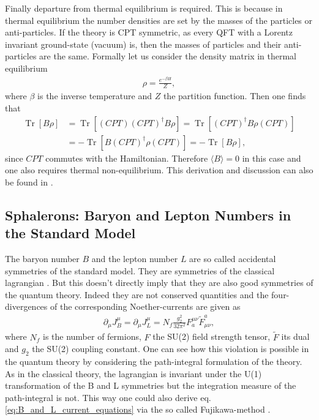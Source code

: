 \documentclass[13pt,a4paper,titlepage]{article}
\newcommand{\Tr}{\operatorname{Tr}}
\begin{document}
\noindent
Finally departure from thermal equilibrium is required. This is because in thermal equilibrium the number densities are set by the
masses of the particles or anti-particles. If the theory is CPT symmetric, as every QFT with a Lorentz invariant ground-state (vacuum) is, then the
masses of particles and their anti-particles are the same.
Formally let us consider the density matrix in thermal equilibrium
\begin{align}
    \rho = \frac{e^{- \beta H}}{Z},
\end{align}
where $\beta$ is the inverse temperature and $Z$ the partition function.
Then one finds that
\begin{align}
    \Tr [ B \rho ] &=  \Tr [ (CPT) (CPT)^\dagger B \rho ] = \Tr [ (CPT)^\dagger B \rho (CPT) ]  \\
                   &= - \Tr [ B (CPT)^\dagger \rho (CPT) ] = - \Tr [ B \rho ],
\end{align}
since $CPT$ commutes with the Hamiltonian. Therefore $\langle B \rangle = 0$ in this case and one also requires thermal non-equilibrium. This derivation and discussion can also be found in \cite[sec. II]{Trodden:2004mj_baryogenesis_and_leptogenesis}.


\subsection{Sphalerons: Baryon and Lepton Numbers in the Standard Model}
\label{sec:sphaelrons}

The baryon number $B$ and the lepton number $L$ are so called accidental
symmetries of the standard model. They are symmetries of the classical lagrangian
\cite[part II.B]{Trodden:2004mj_baryogenesis_and_leptogenesis}.
But this doesn't directly imply that they are also good symmetries of the
quantum theory. Indeed they are not conserved quantities and the four-divergences
of the corresponding Noether-currents are given as \cite[eq. 2.1]{Cline:2006ts_Baryogenesis}
\begin{align}
    \label{eq:B_and_L_current_equations}
    \partial_\mu J^\mu_B = \partial_\mu J^\mu_L = N_f \frac{g_2^2}{32 \pi^2} F^{\mu \nu}_a \tilde{F}_{\mu \nu}^a,
\end{align}
where $N_f$ is the number of fermions, $F$ the SU(2) field strength tensor, $\tilde{F}$ its dual and $g_2$ the SU(2) coupling constant.
One can see how this violation is possible in the quantum theory by considering the path-integral formulation of the theory.
As in the classical theory, the lagrangian is invariant under the U(1) transformation of the B and L symmetries but the integration measure of the path-integral is not. This way one could also derive eq. \eqref{eq:B_and_L_current_equations} via the so called Fujikawa-method \cite{Fujikawa_method_PhysRevD.21.2848}.
\end{document}
